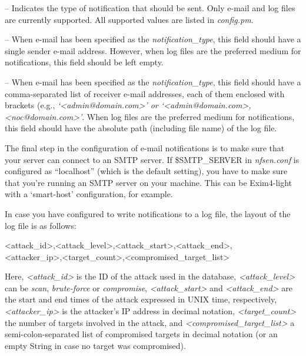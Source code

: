 \begin{description}[font=\normalfont]
	\item [notification\_type] -- Indicates the type of notification that should be sent. Only e-mail and log files are currently supported. All supported values are listed in \textit{config.pm}.
	
	\item [notification\_sender] -- When e-mail has been specified as the \textit{notification\_type}, this field should have a single sender e-mail address. However, when log files are the preferred medium for notifications, this field should be left empty.
	
	\item [notification\_destination] -- When e-mail has been specified as the \textit{notification\_type}, this field should have a comma-separated list of receiver e-mail addresses, each of them enclosed with brackets (e.g., \textit{`<admin@domain.com>' or `<admin@domain.com>,<noc@domain.com>'}. When log files are the preferred medium for notifications, this field should have the absolute path (including file name) of the log file.
\end{description}

The final step in the configuration of e-mail notifications is to make sure that your server can connect to an SMTP server. If \$SMTP\_SERVER in \textit{nfsen.conf} is configured as ``localhost'' (which is the default setting), you have to make sure that you're running an SMTP server on your machine. This can be Exim4-light with a `smart-host' configuration, for example.

In case you have configured to write notifications to a log file, the layout of the log file is as follows: \\

\begin{center}
<attack\_id>,<attack\_level>,<attack\_start>,<attack\_end>,\\<attacker\_ip>,<target\_count>,<compromised\_target\_list> \\
\end{center}

Here, \textit{<attack\_id>} is the ID of the attack used in the database, \textit{<attack\_level>} can be \textit{scan}, \textit{brute-force} or \textit{compromise}, \textit{<attack\_start>} and \textit{<attack\_end>} are the start and end times of the attack expressed in UNIX time, respectively, \textit{<attacker\_ip>} is the attacker's IP address in decimal notation, \textit{<target\_count>} the number of targets involved in the attack, and \textit{<compromised\_target\_list>} a semi-colon-separated list of compromised targets in decimal notation (or an empty String in case no target was compromised).

